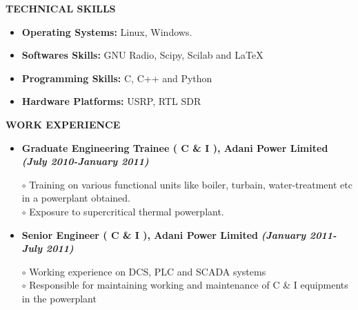 \documentclass[a4paper,10pt]{article}
\begin{document}



 \colorbox{titleColor}{\parbox{6.5in}{\textbf{TECHNICAL SKILLS}}}
 \begin{itemize}
 \setlength{\itemsep}{1pt}
 \item \textbf{{Operating Systems:}} Linux, Windows.
 \item \textbf{{Softwares Skills:}} GNU Radio, Scipy, Scilab and \LaTeX
 \item \textbf{{Programming Skills:}} C, C++ and Python
 \item \textbf{{Hardware Platforms:}} USRP, RTL SDR
 \end{itemize}

 \colorbox{titleColor}{\parbox{6.5in}{\textbf{WORK EXPERIENCE}}}

 \begin{itemize}
 \setlength{\itemsep}{1pt}
 \item \textbf{Graduate Engineering Trainee ( C \& I ), Adani Power Limited}  \textbf \emph{(July 2010-January 2011)}
 
 $\circ$ Training on various functional units like boiler, turbain, water-treatment etc in a powerplant obtained.\\
 $\circ$ Exposure to supercritical thermal powerplant.
 \item \textbf{Senior Engineer ( C \& I ), Adani Power Limited}  \textbf \emph{(January 2011-July 2011)}
 
 $\circ$ Working experience on DCS, PLC and SCADA systems \\
 $\circ$ Responsible for maintaining working and maintenance of C \& I equipments in the powerplant \\

\end{itemize}
\end{document}
